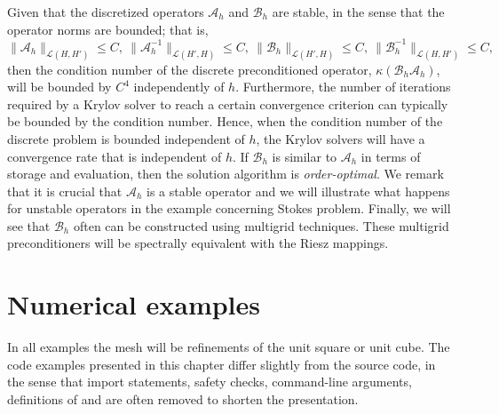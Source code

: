 Given that the discretized operators  $\mathcal{A}_h$ and $\mathcal{B}_h$ are stable, in the sense
that the operator norms are bounded; that is,
 \begin{equation}
\|\mathcal{A}_h\|_{\mathcal{L} (H, H')} \le C, \ \|\mathcal{A}_h^{-1}\|_{\mathcal{L} (H', H)} \le C, \
\|\mathcal{B}_h\|_{\mathcal{L}(H', H)} \le C,  \  \|\mathcal{B}_h^{-1}\|_{\mathcal{L}(H, H')} \le C,
\end{equation}
then the condition number of the discrete preconditioned operator,
$\kappa(\mathcal{B}_h \mathcal{A}_h)$, will be bounded by $C^4$
independently of $h$.  Furthermore, the number of iterations required
by a Krylov solver to reach a certain convergence criterion can
typically be bounded by the condition number. Hence, when the
condition number of the discrete problem is bounded independent of
$h$, the Krylov solvers will have a convergence rate that is
independent of $h$.  If $\mathcal{B}_h$ is similar to $\mathcal{A}_h$
in terms of storage and evaluation, then the solution algorithm
is \emph{order-optimal}.  We remark that it is crucial that
$\mathcal{A}_h$ is a stable operator and we will illustrate what
happens for unstable operators in the example concerning Stokes
problem.  Finally, we will see that $\mathcal{B}_h$ often can be
constructed using multigrid techniques. These multigrid
preconditioners will be spectrally equivalent with the Riesz mappings.

\section{Numerical examples}

In all examples the mesh will be refinements of the unit square or
unit cube.  The code examples presented in this chapter differ
slightly from the source code, in the sense that import statements,
safety checks, command-line arguments, definitions of 
and \emp{Subdomains} are often removed to shorten the presentation.

